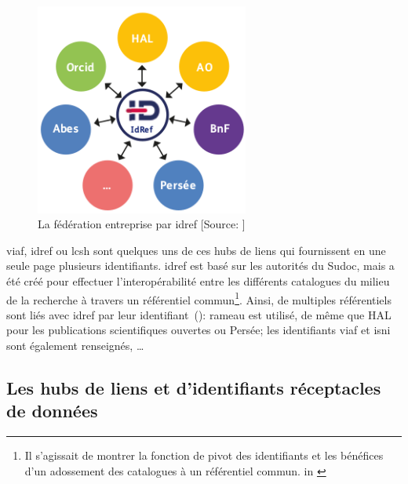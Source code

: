 \begin{figure}[h!]
	\centering
	\includegraphics[width=7cm]{images/idref.png}
	\caption[La fédération entreprise par \ac{idref}]{La fédération entreprise par \ac{idref} [Source: \cite[p.9]{aymonin_arabesques_2017}]}
	\label{idref_schema}
\end{figure}

\ac{viaf}, \ac{idref} ou \ac{lcsh} sont quelques uns de ces hubs de liens qui fournissent en une seule page plusieurs identifiants. \ac{idref} est basé sur les autorités du Sudoc, mais a été créé pour effectuer l'interopérabilité entre les différents catalogues du milieu de la recherche à travers un référentiel commun\footnote{\og Il s’agissait de montrer la fonction de pivot des identifiants et les bénéfices d’un adossement des catalogues à un référentiel commun.\fg{} in \cite[p.9]{aymonin_arabesques_2017}}. Ainsi, de multiples référentiels sont liés avec \ac{idref} par leur identifiant~(): \ac{rameau} est utilisé, de même que HAL pour les publications scientifiques ouvertes ou Persée; les identifiants \ac{viaf} et \ac{isni} sont également renseignés, \dots


\subsection{\label{III-A-2-c}Les hubs de liens et d'identifiants réceptacles de données}

